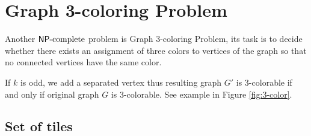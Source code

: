 \section{Graph 3-coloring Problem}



Another $\mathsf{NP}\textnormal{-complete}$ problem is Graph 3-coloring Problem, its task is to decide whether there exists an assignment of three colors to vertices of the graph so that no connected vertices have the same color.

If $k$ is odd, we add a separated vertex thus resulting graph $G'$ is 3-colorable if and only if original graph $G$ is 3-colorable. See example in Figure \ref{fig:3-color}.



\subsection*{Set of tiles}


